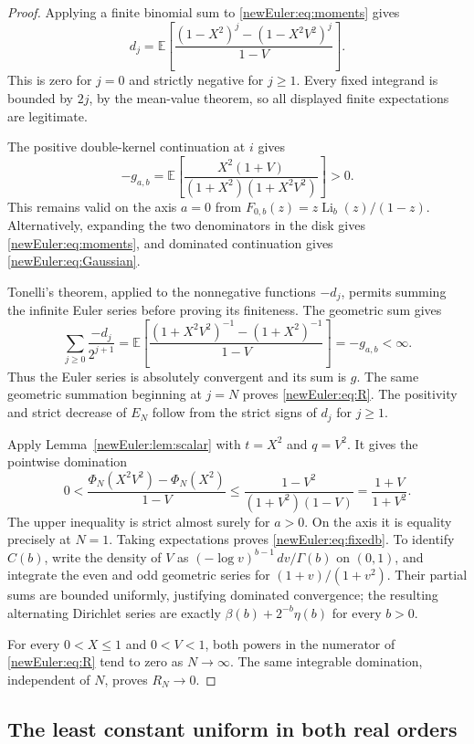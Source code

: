 \begin{proof}
Applying a finite binomial sum to \eqref{newEuler:eq:moments} gives
\[
 d_j=\mathbb E\!\left[
  \frac{(1-X^2)^j-(1-X^2V^2)^j}{1-V}\right].
\]
This is zero for $j=0$ and strictly negative for $j\ge1$. Every
fixed integrand is bounded by $2j$, by the mean-value theorem, so
all displayed finite expectations are legitimate.

The positive double-kernel continuation at $i$ gives
\begin{equation}\label{newEuler:eq:Gaussian}
 -g_{a,b}=\mathbb E\!\left[
 \frac{X^2(1+V)}{(1+X^2)(1+X^2V^2)}\right]>0.
\end{equation}
This remains valid on the axis $a=0$ from
$F_{0,b}(z)=z\operatorname{Li}_b(z)/(1-z)$.
Alternatively, expanding the two denominators in the disk gives
\eqref{newEuler:eq:moments}, and dominated continuation gives
\eqref{newEuler:eq:Gaussian}.

Tonelli's theorem, applied to the nonnegative functions $-d_j$, permits
summing the infinite Euler series before proving its finiteness. The
geometric sum gives
\[
 \sum_{j\ge0}\frac{-d_j}{2^{j+1}}
 =\mathbb E\!\left[
  \frac{(1+X^2V^2)^{-1}-(1+X^2)^{-1}}{1-V}\right]
 =-g_{a,b}<\infty.
\]
Thus the Euler series is absolutely convergent and its sum is $g$.
The same geometric summation beginning at $j=N$ proves
\eqref{newEuler:eq:R}. The positivity and strict decrease of $E_N$
follow from the strict signs of $d_j$ for $j\ge1$.

Apply Lemma~\ref{newEuler:lem:scalar} with $t=X^2$ and $q=V^2$.
It gives the pointwise domination
\[
 0<\frac{\Phi_N(X^2V^2)-\Phi_N(X^2)}{1-V}
 \le\frac{1-V^2}{(1+V^2)(1-V)}
 =\frac{1+V}{1+V^2}.
\]
The upper inequality is strict almost surely for $a>0$. On the axis
it is equality precisely at $N=1$. Taking expectations proves
\eqref{newEuler:eq:fixedb}. To identify $C(b)$, write the density
of $V$ as $(-\log v)^{b-1}\,dv/\Gamma(b)$ on $(0,1)$, and
integrate the even and odd geometric series for $(1+v)/(1+v^2)$.
Their partial sums are bounded uniformly, justifying dominated
convergence; the resulting alternating Dirichlet series are exactly
$\beta(b)+2^{-b}\eta(b)$ for every $b>0$.

For every $0<X\le1$ and $0<V<1$, both powers in the numerator of
\eqref{newEuler:eq:R} tend to zero as $N\to\infty$.
The same integrable domination, independent of $N$, proves $R_N\to0$.
\end{proof}

\subsection{The least constant uniform in both real orders}

